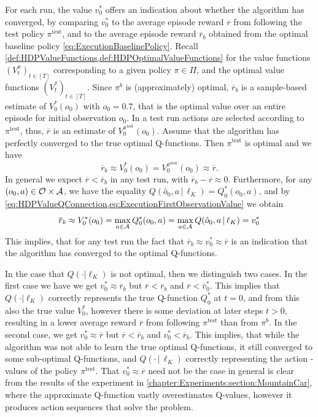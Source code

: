 \documentclass[
    a4paper,
    11pt,
    bibliography=totoc,
    listof=totoc,      
    headinclude=true,
    cleardoublepage=empty,
]{scrbook}
\theoremstyle{plain}
\theoremstyle{definition}
\theoremstyle{remark}
\newcommand{\SpaceA}{{\cal A}}
\newcommand{\SpaceO}{{\cal O}}
\begin{document}
For each run, the value $v_0^*$ offers an indication about whether the 
algorithm has converged, by comparing $v_0^*$ to the average episode reward 
$\overline r$ from following the test policy $\pi^\text{test}$, and to the average 
episode reward $\overline r_b$ obtained from the optimal baseline policy 
\eqref{eq:ExecutionBaselinePolicy}. Recall
\cref{def:HDPValueFunctions,def:HDPOptimalValueFunctions} for 
the value functions $(V^\pi_t)_{t\in[T]}$ corresponding to a given policy 
$\pi\in\Pi$, and the optimal value functions $(V_t^*)_{t\in[T]}$.
%
Since $\pi^b$ is (approximately) optimal, $\overline{r}_b$ is a sample-based
estimate of $V_0^*(o_0)$ with $o_0 = 0.7$, that is the optimal value over an 
entire episode for initial observation $o_0$. In a test run actions are 
selected according to $\pi^\text{test}$, thus, $\overline{r}$ is an estimate of 
$V^{\pi^\text{test}}_0(o_0)$. 
%
Assume that the algorithm has perfectly converged to the true optimal 
Q-functions. Then $\pi^\text{test}$ is optimal and we have
\[
    \overline r_b \approx V_0^*(o_0) = V_0^{\pi^\text{test}}(o_0) \approx \overline r.
\]
In general we expect $\overline{r}<\overline{r}_b$ in any test run, with $\overline{r}_b - 
\overline{r} \approx 0$.
%
Furthermore, for any $(o_0, a)\in\SpaceO\times\SpaceA$, we have the equality 
$Q(\hat{o}_0, a\,|\,\ell_K) = Q_0^*(o_0, a)$, and by 
\cref{eq:HDPValueQConnection,eq:ExecutionFirstObservationValue} we obtain
\[
    \overline r_b \approx V_0^*(o_0)
    = \max_{a\in\SpaceA} Q_0^*(o_0, a)
    = \max_{a\in\SpaceA} Q(\hat{o}_0, a\,|\, \ell_K) 
    = v_0^*
\]
This implies, that for any test run the fact that $\overline r_b \approx 
v_0^*\approx \overline r$ is an indication that the algorithm has converged to the 
optimal Q-functions.

In the case that $Q(\cdot|\ell_K)$ is not optimal, then we distinguish two 
cases. In the first case we have we get $v_0^*\approx \overline r_b$ but $\overline r <
\overline r_b$ and $\overline r < \bar v_0^*$. This implies that $Q(\cdot|\ell_K)$ 
correctly represents the true Q-function $Q_0^*$ at $t=0$, and from this also 
the true value $V_0^*$, however there is some deviation at later steps $t>0$, 
resulting in a lower average reward $\overline r$ from following $\pi^\text{test}$ 
than from $\pi^b$.
%
In the second case, we get $v_0^*\approx \overline r$ but $\overline r < \overline r_b$ and 
$v_0^* < \overline r_b$. This implies, that while the algorithm was not able to 
learn the true optimal Q-functions, it still converged to some sub-optimal 
Q-functions, and $Q(\cdot\,|\,\ell_K)$ correctly representing the action
-values of the policy $\pi^\text{test}$. That $v_0^*\approx\overline{r}$ need not 
be the case in general is clear from the results of the experiment in 
\cref{chapter:Experiments:section:MountainCar}, where the approximate 
Q-function vastly overestimates Q-values, however it produces action sequences 
that solve the problem.
\end{document}
